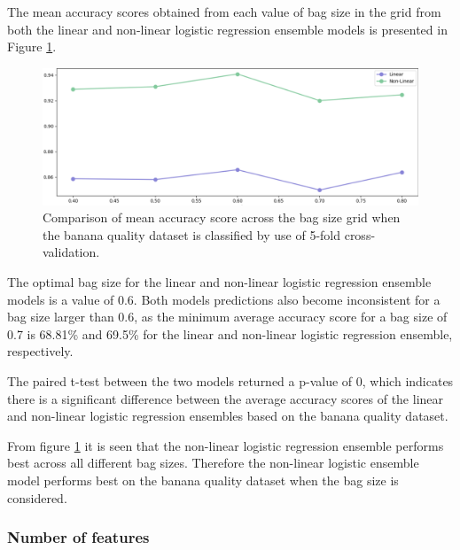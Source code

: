\documentclass[10pt, conference]{IEEEtran}
\begin{document}
The mean accuracy scores obtained from each value of bag size in the grid from both the linear and non-linear
logistic regression ensemble models is presented in Figure \ref{fig:BQ_bag_comparison}.
\begin{figure}[H]
    \centerline{\includegraphics[scale=0.26]{../Images/BQ_bag.PNG}}
    \caption{Comparison of mean accuracy score across the bag size grid when the banana quality dataset is classified by use of 5-fold cross-validation.}
    \label{fig:BQ_bag_comparison}
\end{figure}
The optimal bag size for the linear and non-linear logistic regression ensemble models is a value of 0.6.
Both models predictions also become inconsistent for a bag size larger than 0.6, as the minimum average
accuracy score for a bag size of 0.7 is 68.81\% and 69.5\% for the linear and non-linear logistic regression
ensemble, respectively.

The paired t-test between the two models returned a p-value of 0, which indicates there is a significant difference
between the average accuracy scores of the linear and non-linear logistic regression ensembles based on the banana
quality dataset.

From figure \ref{fig:BQ_bag_comparison} it is seen that the non-linear logistic regression ensemble performs best across
all different bag sizes. Therefore the non-linear logistic ensemble model performs best on the banana quality dataset when the
bag size is considered.

\subsubsection{Number of features}
\end{document}
